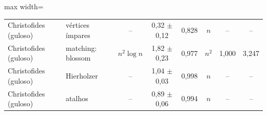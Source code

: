 \begin{table}[htb]
\begin{adjustbox}{max width=\linewidth}
\begin{tabular}{llcccccc}
Christofides (guloso) & vértices ímpares & -- & 0{,}32 $\pm$ 0{,}12 & 0{,}828 & $n$ & -- & -- \\
Christofides (guloso) & matching: blossom & $n^2\log n$ & 1{,}82 $\pm$ 0{,}23 & 0{,}977 & $n^2$ & 1{,}000 & 3{,}247 \\
Christofides (guloso) & Hierholzer & -- & 1{,}04 $\pm$ 0{,}03 & 0{,}998 & $n$ & -- & -- \\
Christofides (guloso) & atalhos & -- & 0{,}89 $\pm$ 0{,}06 & 0{,}994 & $n$ & -- & -- \\
\bottomrule
\end{tabular}
\end{adjustbox}
\end{table}
